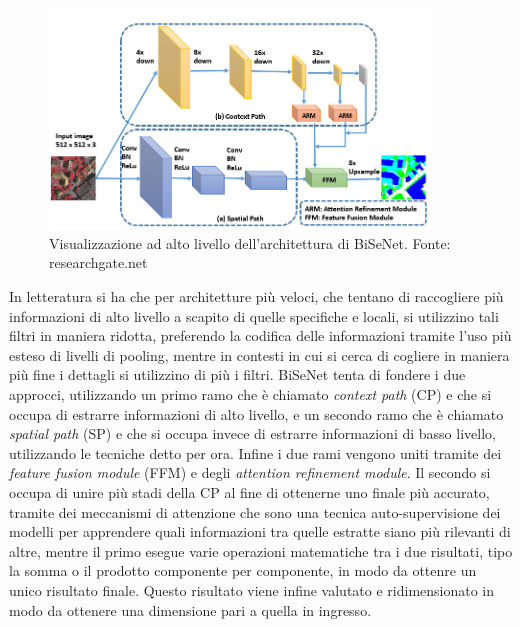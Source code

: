 \begin{figure}
    \center
    \includegraphics[width=0.9\textwidth]{./assets/bisenet.jpg}
    \caption{\label{fig:bisenet}Visualizzazione ad alto livello dell'architettura di BiSeNet. Fonte: researchgate.net}
\end{figure}

In letteratura si ha che per architetture più veloci, che tentano
di raccogliere più informazioni di alto livello a scapito di quelle
specifiche e locali, si utilizzino tali filtri in maniera ridotta,
preferendo la codifica delle informazioni tramite l'uso più esteso
di livelli di pooling, mentre in contesti in cui si cerca di
cogliere in maniera più fine i dettagli si utilizzino di più i filtri.
BiSeNet tenta di fondere i due approcci, utilizzando un primo ramo
che è chiamato {\it context path} (CP) e che si occupa di estrarre
informazioni di alto livello, e un secondo ramo che è chiamato
{\it spatial path} (SP) e che si occupa invece di estrarre informazioni
di basso livello, utilizzando le tecniche detto per ora.
Infine i due rami vengono uniti tramite dei
{\it feature fusion module} (FFM) e degli
{\it attention refinement module}.
Il secondo si occupa di unire più stadi della CP al fine di ottenerne
uno finale più accurato, tramite dei meccanismi di attenzione che sono
una tecnica auto-supervisione dei modelli per apprendere quali 
informazioni tra quelle estratte siano più rilevanti di altre,
mentre il primo esegue varie operazioni matematiche tra i due
risultati, tipo la somma o il prodotto componente per componente, 
in modo da ottenre un unico risultato finale.
Questo risultato viene infine valutato e ridimensionato in modo
da ottenere una dimensione pari a quella in ingresso.



